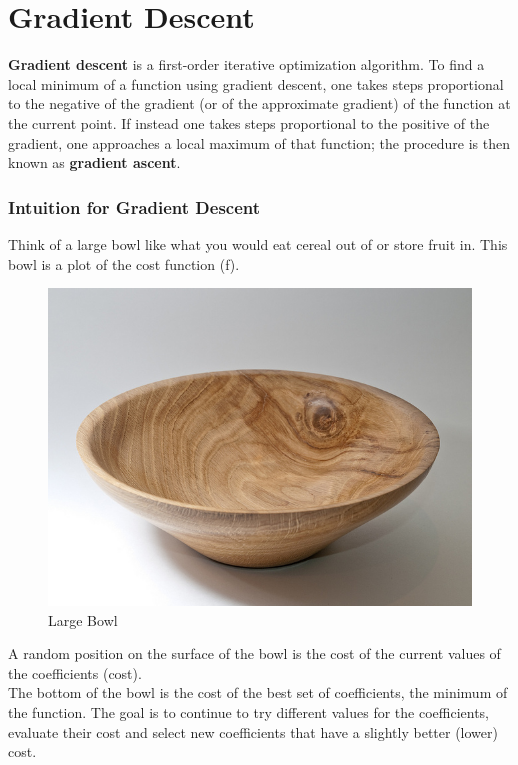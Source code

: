 \documentclass[11pt, a4paper]{report}
\begin{document}
\section{Gradient Descent}
\textbf{Gradient descent} is a first-order iterative optimization algorithm. To find a local minimum of a function using gradient descent, one takes steps proportional to the negative of the gradient (or of the approximate gradient) of the function at the current point. If instead one takes steps proportional to the positive of the gradient, one approaches a local maximum of that function; the procedure is then known as \textbf{gradient ascent}.

\subsubsection{Intuition for Gradient Descent}
Think of a large bowl like what you would eat cereal out of or store fruit in. This bowl is a plot of the cost function (f).

	\begin{figure}[!bth]
	\center
	\includegraphics[scale=0.32]{images/Large-Bowl.jpg}
	\caption[Large Bowl]{Large Bowl \cite{fig:largeBowl}}
	\label{fig:largeBowl}
	\end{figure}

A random position on the surface of the bowl is the cost of the current values of the coefficients (cost). \\

The bottom of the bowl is the cost of the best set of coefficients, the minimum of the function.
The goal is to continue to try different values for the coefficients, evaluate their cost and select new coefficients that have a slightly better (lower) cost. \\
\end{document}

